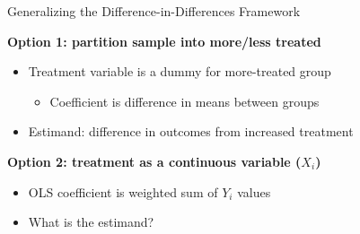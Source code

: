 \documentclass[10pt,xcolor=table,ignorenonframetext,aspectratio=169]{beamer}
\newlength{\wideitemsep}
\let\olditem\item
\renewcommand{\item}{\setlength{\itemsep}{\wideitemsep}\olditem}
\begin{document}
\begin{frame}{Generalizing the Difference-in-Differences Framework}

\medskip
\textbf{Option 1:  partition sample into more/less treated}

\medskip
\begin{itemize}
	
	\item Treatment variable is a dummy for more-treated group
	
	\medskip
	\begin{itemize}
		
		\item Coefficient is difference in means between groups
		
	\end{itemize}

\pause
\item Estimand: difference in outcomes from increased treatment
	
\end{itemize}

\pause
\medskip
\medskip
\textbf{Option 2:  treatment as a continuous variable ($X_i$)}

\medskip
\begin{itemize}
	
	
	\item OLS coefficient is weighted sum of $Y_i$ values
	
	\item What is the estimand?  
	
\end{itemize}


\end{frame}




\end{document}
